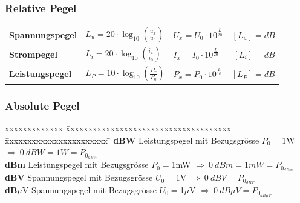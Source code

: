 \subsubsection{Relative Pegel}
\begin{tabular}{lllr}
	\colorbox{green!30}{\textbf{Spannungspegel}}&  
	$L_u = 20 \cdot \log_{10} \left(\frac{u_x}{u_0}\right)$&
	$U_x = U_0 \cdot 10^{\frac{L}{20}} $ &
	$[L_u] = dB$\\
	
	\textbf{Strompegel}& $L_i  = 20 \cdot \log_{10} \left(\frac{i_x}{i_0}\right)$& $I_x = I_0 \cdot
	10^{\frac{L}{20}} $ & $[L_i] = dB$\\
	
	\colorbox{cyan!30}{\textbf{Leistungspegel}} & $L_P = 10 \cdot \log_{10} \left(\frac{P_x}{P_0}\right)$ & $P_x = P_0 \cdot
	10^{\frac{L}{10}} $ & $[L_P] = dB$ \\
\end{tabular}\renewcommand{\arraystretch}{1}%
\subsubsection{Absolute Pegel}
\begin{tabbing}
	xxxxxxxxxxxxx \= xxxxxxxxxxxxxxxxxxxxxxxxxxxxxxxxxxxxx  \= xxxxxxxxxxxxxxxxxxxxxxx \=\kill
	\colorbox{cyan!30}{\textbf{dBW}} \> Leistungspegel mit Bezugsgrösse $P_0 = $1W \> $\Longrightarrow \: 0 \: dBW = 1W = P_{0_{dBW}}$\\
	\colorbox{cyan!30}{\textbf{dBm}} \> Leistungspegel mit Bezugsgrösse $P_0 = $1mW \> $\Longrightarrow \: 0 \: dBm = 1mW = P_{0_{dBm}}$\\
	\colorbox{green!30}{\textbf{dBV}} \> Spannungspegel mit Bezugsgrösse $U_0 = $1V \> $\Longrightarrow \: 0 \: dBV = P_{0_{dBV}}$\\
	\colorbox{green!30}{\textbf{dB}$\mu$V} \> Spannungspegel mit Bezugsgrösse $U_0 = $1$\mu$V \> $\Longrightarrow \: 0 \: dB \mu V = P_{0_{dB\mu V}}$
\end{tabbing}